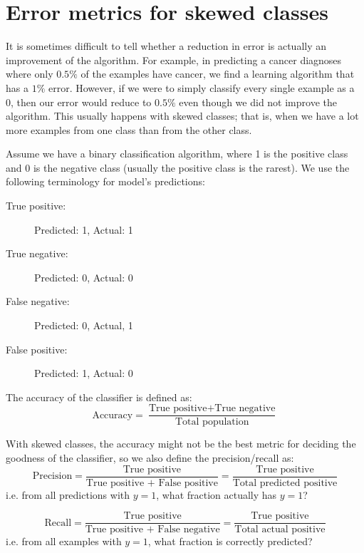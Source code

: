 \documentclass[a4paper,11pt]{report}
\begin{document}
\section{Error metrics for skewed classes}

It is sometimes difficult to tell whether a reduction in error is actually an improvement of the algorithm. For example, in predicting a cancer diagnoses where only $0.5\%$ of the examples have cancer, we find a learning algorithm that has a $1\%$ error. However, if we were to simply classify every single example as a 0, then our error would reduce to $0.5\%$ even though we did not improve the algorithm.
This usually happens with skewed classes; that is, when we have a lot more examples from one class than from the other class.

Assume we have a binary classification algorithm, where 1 is the positive class and 0 is the negative class (usually the positive class is the rarest). We use the following terminology for model's predictions:
\begin{description}
  \item[True positive:] Predicted: 1, Actual: 1
  \item[True negative:] Predicted: 0, Actual: 0
  \item[False negative:] Predicted: 0, Actual, 1
  \item[False positive:] Predicted: 1, Actual: 0
\end{description}

The accuracy of the classifier is defined as:
\begin{equation}\label{df:accuracy}
\textrm{Accuracy} = \dfrac{\textrm{True positive} + \textrm{True negative}} {\textrm{Total population}}
\end{equation}

With skewed classes, the accuracy might not be the best metric for deciding the goodness of the classifier, so we also define the precision/recall as:
\begin{equation}\label{df:precision}
\textrm{Precision} = \dfrac{\textrm{True positive}}{\textrm{True positive + False positive}} = \dfrac{\textrm{True positive}}{\textrm{Total predicted positive}}
\end{equation}
i.e. from all predictions with $y=1$, what fraction actually has $y=1$?

\begin{equation}\label{df:recall}
\textrm{Recall} = \dfrac{\textrm{True positive}}{\textrm{True positive + False negative}} = \dfrac{\textrm{True positive}}{\textrm{Total actual positive}}
\end{equation}
i.e. from all examples with $y=1$, what fraction is correctly predicted?
\end{document}
